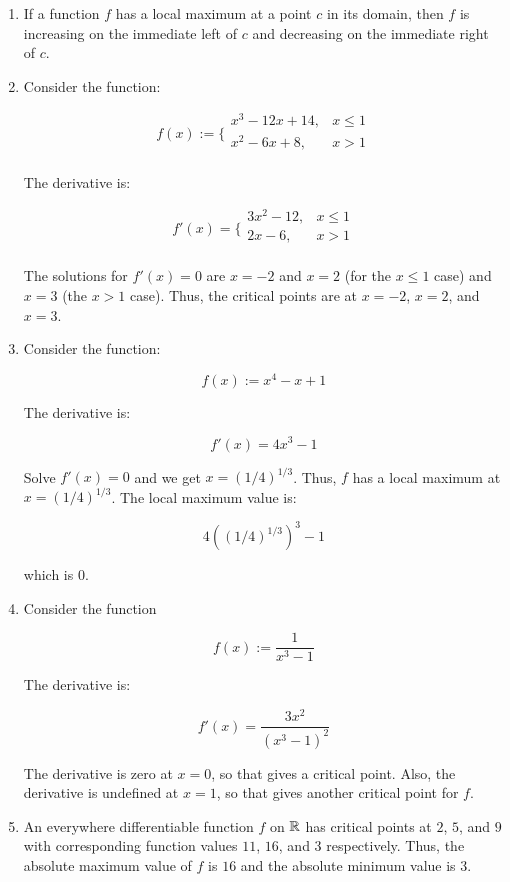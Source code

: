 \documentclass[10pt]{amsart}
\begin{document}
\begin{enumerate}
\item If a function $f$ has a local maximum at a point $c$ in its
  domain, then $f$ is increasing on the immediate left of $c$ and
  decreasing on the immediate right of $c$.
\item Consider the function:

  $$f(x) := \lbrace\begin{array}{rl} x^3 - 12x + 14, & x \le 1 \\ x^2 - 6x + 8, & x > 1 \\\end{array}$$

  The derivative is:

  $$f'(x) = \lbrace\begin{array}{rl} 3x^2 - 12, & x \le 1 \\ 2x - 6, & x > 1 \\\end{array}$$

  The solutions for $f'(x) = 0$ are $x = -2$ and $x = 2$ (for the $x
  \le 1$ case) and $x = 3$ (the $x > 1$ case). Thus, the critical
  points are at $x = -2$, $x = 2$, and $x = 3$.
\item Consider the function:

  $$f(x) := x^4 - x + 1$$

  The derivative is:

  $$f'(x) = 4x^3 - 1$$

  Solve $f'(x) = 0$ and we get $x = (1/4)^{1/3}$. Thus, $f$ has a
  local maximum at $x = (1/4)^{1/3}$. The local maximum value is:

  $$4((1/4)^{1/3})^3 - 1$$

  which is $0$.

\item Consider the function

  $$f(x) := \frac{1}{x^3 - 1}$$

  The derivative is:

  $$f'(x) = \frac{3x^2}{(x^3 - 1)^2}$$

  The derivative is zero at $x = 0$, so that gives a critical
  point. Also, the derivative is undefined at $x = 1$, so that gives
  another critical point for $f$.

\item An everywhere differentiable function $f$ on $\mathbb{R}$ has critical
  points at $2$, $5$, and $9$ with corresponding function values $11$,
  $16$, and $3$ respectively. Thus, the absolute maximum value of $f$
  is $16$ and the absolute minimum value is $3$.
\end{enumerate}
 
\end{document}
